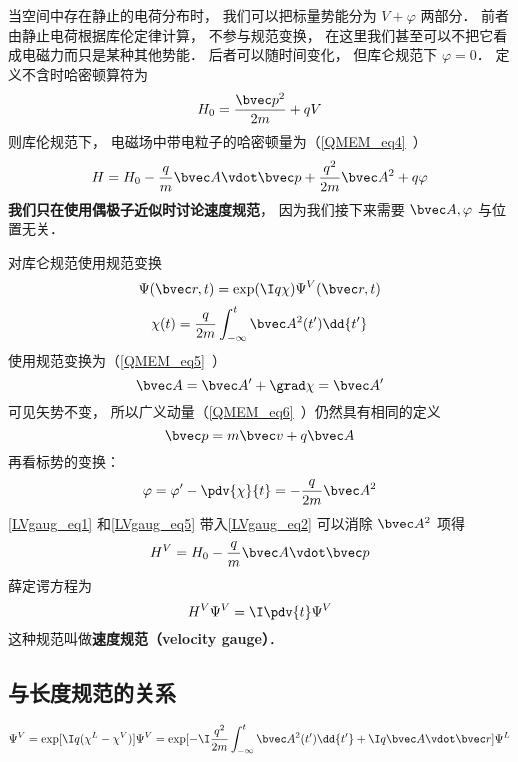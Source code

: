 

当空间中存在静止的电荷分布时， 我们可以把标量势能分为 $V + \varphi$ 两部分． 前者由静止电荷根据库伦定律计算， 不参与规范变换， 在这里我们甚至可以不把它看成电磁力而只是某种其他势能． 后者可以随时间变化， 但库仑规范下 $\varphi = 0$． 定义不含时哈密顿算符为
\begin{equation}
H_0 = \frac{\bvec p^2}{2m} + qV
\end{equation}
则库伦规范下， 电磁场中带电粒子的哈密顿量为（\autoref{QMEM_eq4}~）
\begin{equation}\label{LVgaug_eq2}
H = H_0 - \frac{q}{m} \bvec A \vdot \bvec p + \frac{q^2}{2m} \bvec A^2 + q\varphi
\end{equation}
\textbf{我们只在使用偶极子近似时讨论速度规范}， 因为我们接下来需要 $\bvec A, \varphi$ 与位置无关．

对库仑规范使用规范变换
\begin{equation}\label{LVgaug_eq3}
\Psi(\bvec r, t) = \exp(\I q\chi)\Psi^V(\bvec r, t)
\end{equation}
\begin{equation}\label{LVgaug_eq4}
\chi(t) = \frac{q}{2m} \int_{-\infty}^t \bvec A^2(t') \dd{t'}
\end{equation}
使用规范变换为（\autoref{QMEM_eq5}~）
\begin{equation}\label{LVgaug_eq1}
\bvec A = \bvec A' + \grad \chi = \bvec A'
\end{equation}
可见矢势不变， 所以广义动量（\autoref{QMEM_eq6}~）仍然具有相同的定义
\begin{equation}
\bvec p = m\bvec v + q\bvec A
\end{equation}
再看标势的变换：
\begin{equation}\label{LVgaug_eq5}
\varphi = \varphi' - \pdv{\chi}{t} = - \frac{q}{2m} \bvec A^2
\end{equation}
\autoref{LVgaug_eq1} 和\autoref{LVgaug_eq5} 带入\autoref{LVgaug_eq2} 可以消除 $\bvec A^2$ 项得
\begin{equation}
H^V = H_0 - \frac{q}{m} \bvec A \vdot \bvec p
\end{equation}
薛定谔方程为
\begin{equation}
H^V \Psi^V = \I \pdv{t} \Psi^V
\end{equation}
这种规范叫做\textbf{速度规范（velocity gauge）}．

\subsection{与长度规范的关系}
\begin{equation}
\Psi^V = \exp[\I q(\chi^L - \chi^V)]\Psi^V = \exp[-\I\frac{q^2}{2m}\int_{-\infty}^t \bvec A^2(t')\dd{t'} + \I q \bvec A\vdot \bvec r] \Psi^L
\end{equation}
